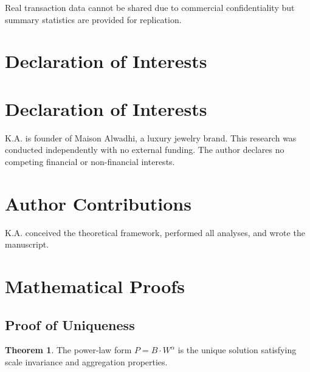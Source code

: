 \documentclass[12pt,a4paper]{article}
\theoremstyle{definition}
\newtheorem{theorem}{Theorem}
\theoremstyle{remark}
\begin{document}
Real transaction data cannot be shared due to commercial confidentiality but summary statistics are provided for replication.

\section*{Declaration of Interests}

\section*{Declaration of Interests}

K.A. is founder of Maison Alwadhi, a luxury jewelry brand. This research was conducted independently with no external funding. The author declares no competing financial or non-financial interests.

\section*{Author Contributions}

K.A. conceived the theoretical framework, performed all analyses, and wrote the manuscript.




\appendix

\section{Mathematical Proofs}

\subsection{Proof of Uniqueness}

\begin{theorem}
The power-law form $P = B \cdot W^{\alpha}$ is the unique solution satisfying scale invariance and aggregation properties.
\end{theorem}
\end{document}
